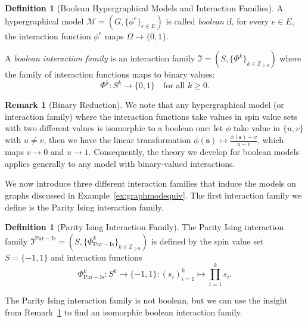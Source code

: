 \documentclass[11pt,reqno]{amsart}
\newcommand{\vecs}{\boldsymbol{s}}
\newcommand{\Mo}{\mathcal{M}}
\newcommand{\statespace}{\Omega}
\newcommand{\IFam}{\mathfrak{I}}
\newcommand{\mci}{\mathfrak{I}^{\mathrm{Par-Is}}}
\newcommand{\sset}{spin value set }
\newcommand{\PhiIs}{\Phi_{\mathrm{Par-Is}}}
\theoremstyle{plain}
\theoremstyle{definition}
\newtheorem{definition}[theorem]{Definition}
\newtheorem{remark}[theorem]{Remark}
\numberwithin{equation}{section}
\begin{document}
\begin{definition}[Boolean Hypergraphical Models and Interaction Families]
    A hypergraphical model $\Mo = (G, \{\phi^e\}_{e \in E} )$ is called \emph{boolean} if, for every $e \in E$, the interaction function $\phi^e$ maps $\statespace \to \{0,1\}$.

    A \emph{boolean interaction family} is an interaction family $\IFam = (S, \{\Phi^k\}_{k \in \mathbb{Z}_{\geq 0}})$ where the family of interaction functions maps to binary values:
    \[ \Phi^k \colon S^k \to \{0,1\} \quad \text{for all } k \geq 0. \]
\end{definition}
\begin{remark}[Binary Reduction]
\label{rem:binary_reduction}
    We note that any hypergraphical model (or interaction family) where the interaction functions take values in spin value sets with two different values is isomorphic to a boolean one: let $\phi$ take value in $\{u,v\}$ with $u \neq v$, then we have the linear transformation $\phi(\vecs) \mapsto \frac{\phi(\vecs) - v}{u - v}$, which maps $v \to 0$ and $u \to 1$. Consequently, the theory we develop for boolean models applies generally to any model with binary-valued interactions.
\end{remark}

We now introduce three different interaction families that induce the models on graphs discussed in Example~\ref{ex:graphmodequiv}. The first interaction family we define is the Parity Ising interaction family.

\begin{definition}[Parity Ising Interaction Family]
    \label{def:parisclass}
    The Parity Ising interaction family $\mci = (S, \{\PhiIs^k\}_{k \in \mathbb{Z}_{\geq 0}})$ is defined by the \sset $S = \{-1, 1\}$ and interaction functions
    \[
    \PhiIs^k \colon S^k \to \{-1,1\} \colon (s_i)_{i=1}^k \mapsto \prod_{i=1}^k s_i.
    \]
\end{definition}

The Parity Ising interaction family is not boolean, but we can use the insight from Remark~\ref{rem:binary_reduction} to find an isomorphic boolean interaction family.
\end{document}
